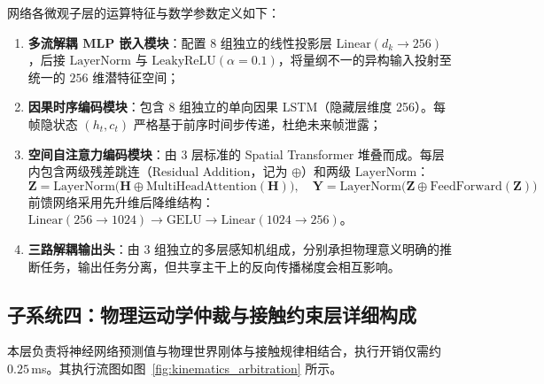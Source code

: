 \documentclass[UTF8,11pt,a4paper]{ctexart}
\begin{document}
网络各微观子层的运算特征与数学参数定义如下：
\begin{enumerate}
    \item \textbf{多流解耦 MLP 嵌入模块}：配置 8 组独立的线性投影层 $\text{Linear}(d_k \to 256)$，后接 $\text{LayerNorm}$ 与 $\text{LeakyReLU}(\alpha=0.1)$，将量纲不一的异构输入投射至统一的 $256$ 维潜特征空间；
    \item \textbf{因果时序编码模块}：包含 8 组独立的单向因果 LSTM（隐藏层维度 256）。每帧隐状态 $(h_t, c_t)$ 严格基于前序时间步传递，杜绝未来帧泄露；
    \item \textbf{空间自注意力编码模块}：由 3 层标准的 Spatial Transformer 堆叠而成。每层内包含两级残差跳连（Residual Addition，记为 $\oplus$）和两级 $\text{LayerNorm}$：
    \[
    \mathbf{Z} = \text{LayerNorm}\big(\mathbf{H} \oplus \text{MultiHeadAttention}(\mathbf{H})\big), \quad
    \mathbf{Y} = \text{LayerNorm}\big(\mathbf{Z} \oplus \text{FeedForward}(\mathbf{Z})\big)
    \]
    前馈网络采用先升维后降维结构：$\text{Linear}(256 \to 1024) \to \text{GELU} \to \text{Linear}(1024 \to 256)$。
    \item \textbf{三路解耦输出头}：由 3 组独立的多层感知机组成，分别承担物理意义明确的推断任务，输出任务分离，但共享主干上的反向传播梯度会相互影响。
\end{enumerate}

\subsection{子系统四：物理运动学仲裁与接触约束层详细构成}
\label{subsec:kinematics_arbitration}
本层负责将神经网络预测值与物理世界刚体与接触规律相结合，执行开销仅需约 $0.25$\,ms。其执行流图如图~\ref{fig:kinematics_arbitration} 所示。
\end{document}
